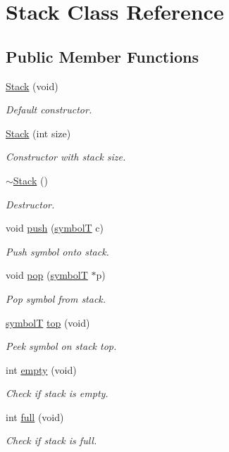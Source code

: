 \hypertarget{classStack}{}\section{Stack Class Reference}
\label{classStack}
\subsection*{Public Member Functions}
\begin{DoxyCompactItemize}
\item 
\hyperlink{classStack_aa6e4e33ccce6c9a8df6e5519418bbd45}{Stack} (void)
\begin{DoxyCompactList}\small\item\em Default constructor. \end{DoxyCompactList}\item 
\hyperlink{classStack_a8dc60fa32e08d0b556bf66f52e0b8af8}{Stack} (int size)
\begin{DoxyCompactList}\small\item\em Constructor with stack size. \end{DoxyCompactList}\item 
\hyperlink{classStack_a40bd5dff912f0e5290777c4b46d17809}{$\sim$\+Stack} ()
\begin{DoxyCompactList}\small\item\em Destructor. \end{DoxyCompactList}\item 
void \hyperlink{classStack_a974a67de02f49899ec9b4a53e6f8d157}{push} (\hyperlink{structsymbolT}{symbolT} c)
\begin{DoxyCompactList}\small\item\em Push symbol onto stack. \end{DoxyCompactList}\item 
void \hyperlink{classStack_a220c17d4bafbab660762be294d39c3eb}{pop} (\hyperlink{structsymbolT}{symbolT} $\ast$p)
\begin{DoxyCompactList}\small\item\em Pop symbol from stack. \end{DoxyCompactList}\item 
\hyperlink{structsymbolT}{symbolT} \hyperlink{classStack_a5e190884440b0eed5edf06f31d70244f}{top} (void)
\begin{DoxyCompactList}\small\item\em Peek symbol on stack top. \end{DoxyCompactList}\item 
int \hyperlink{classStack_ae340b80cf90a09d5fd6e14efe73f1166}{empty} (void)
\begin{DoxyCompactList}\small\item\em Check if stack is empty. \end{DoxyCompactList}\item 
int \hyperlink{classStack_a30424a3106b7c53dced7c630e35308d6}{full} (void)
\begin{DoxyCompactList}\small\item\em Check if stack is full. \end{DoxyCompactList}\end{DoxyCompactItemize}


